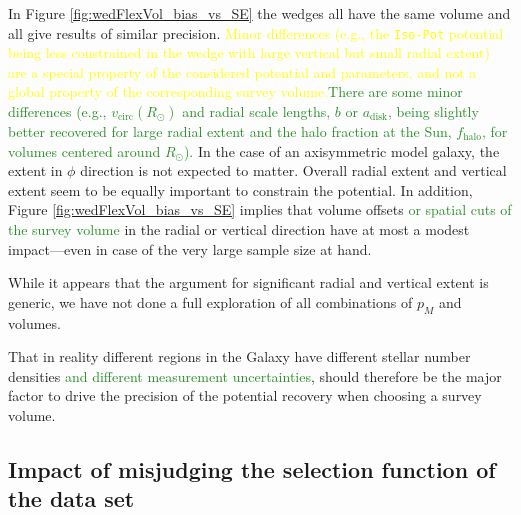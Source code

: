 \documentclass[iop,revtex4,numberedappendix,appendixfloats]{emulateapj}
\newcommand{\pmodel}{\ensuremath{p_M}}
\newcommand{\NEW}[1]{\textcolor{ForestGreen}{#1}}
\newcommand{\OLD}[1]{\textcolor{Yellow}{#1}}%
\begin{document}
In Figure \ref{fig:wedFlexVol_bias_vs_SE} the wedges all have the same volume and all give results of similar precision. \OLD{Minor differences (e.g., the \texttt{Iso-Pot} potential being less constrained in the wedge with large vertical but small radial extent) are a special property of the considered potential and parameters, and not a global property of the corresponding survey volume.}\NEW{There are some minor differences (e.g., $v_\text{circ}(R_\odot)$ and radial scale lengths, $b$ or $a_\text{disk}$, being slightly better recovered for large radial extent and the halo fraction at the Sun, $f_\text{halo}$, for volumes centered around $R_\odot$).} In the case of an axisymmetric model galaxy, the extent in $\phi$ direction is not expected to matter. Overall radial extent and vertical extent seem to be equally important to constrain the potential. In addition, Figure \ref{fig:wedFlexVol_bias_vs_SE} implies that volume offsets \NEW{or spatial cuts of the survey volume} in the radial or vertical direction have at most a modest impact---even in case of the very large sample size at hand.

While it appears that the argument for significant radial and vertical extent is generic, we have not done a full exploration of all combinations of \pmodel{} and volumes.

That in reality different regions in the Galaxy have different stellar number densities\NEW{ and different measurement uncertainties}, should therefore be the major factor to drive the precision of the potential recovery when choosing a survey volume.

\subsection{Impact of misjudging the selection function of the data set} \label{sec:results_incompR}
\end{document}
